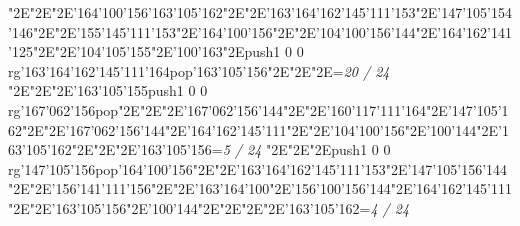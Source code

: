 \null\vfill\enskip\enskip\enskip\ipa\char"2E\enskip\enskip\enskip\ipa\char"2E\enskip\ipa\char"2E\ipa\char'164\ipa\char'100\ipa\char'156\bigskip\ipa\char'163\ipa\char'105\ipa\char'162\ipa\char"2E\enskip\enskip\enskip\ipa\char"2E\ipa\char'163\ipa\char'164\ipa\char'162\ipa\char'145\ipa\char'111\ipa\char'153\bigskip\enskip\enskip\ipa\char"2E\ipa\char'147\ipa\char'105\ipa\char'154\ipa\char'146\ipa\char"2E\enskip\ipa\char"2E\ipa\char'155\ipa\char'145\ipa\char'111\ipa\char'153\ipa\char"2E\ipa\char'164\ipa\char'100\ipa\char'156\ipa\char"2E\enskip\enskip\enskip\ipa\char"2E\ipa\char'104\ipa\char'100\ipa\char'156\ipa\char'144\bigskip\enskip\ipa\char"2E\ipa\char'164\ipa\char'162\ipa\char'141\ipa\char'125\ipa\char"2E\enskip\enskip\ipa\char"2E\ipa\char'104\ipa\char'105\ipa\char'155\ipa\char"2E\ipa\char'100\ipa\char'163\ipa\char"2E\pdfcolorstack\match push{1 0 0 rg}\ipa\char'163\ipa\char'164\ipa\char'162\ipa\char'145\ipa\char'111\ipa\char'164\pdfcolorstack\match pop{}\bigskip\ipa\char'163\ipa\char'105\ipa\char'156\ipa\char"2E\enskip\enskip\ipa\char"2E\enskip\enskip\enskip\ipa\char"2E\enskip\enskip\enskip\bigskip\vfill\footline={\hfill\tenrm\it 20 / 24}\eject
\null\vfill\enskip\enskip\enskip\ipa\char"2E\enskip\enskip\enskip\ipa\char"2E\enskip\ipa\char"2E\ipa\char'163\ipa\char'105\ipa\char'155\bigskip\pdfcolorstack\match push{1 0 0 rg}\ipa\char'167\ipa\char'062\ipa\char'156\pdfcolorstack\match pop{}\ipa\char"2E\enskip\enskip\enskip\ipa\char"2E\enskip\enskip\enskip\enskip\enskip\enskip\bigskip\enskip\enskip\ipa\char"2E\ipa\char'167\ipa\char'062\ipa\char'156\ipa\char'144\ipa\char"2E\enskip\ipa\char"2E\ipa\char'160\ipa\char'117\ipa\char'111\ipa\char'164\ipa\char"2E\ipa\char'147\ipa\char'105\ipa\char'162\ipa\char"2E\enskip\enskip\enskip\ipa\char"2E\ipa\char'167\ipa\char'062\ipa\char'156\ipa\char'144\bigskip\enskip\ipa\char"2E\ipa\char'164\ipa\char'162\ipa\char'145\ipa\char'111\ipa\char"2E\enskip\enskip\ipa\char"2E\ipa\char'104\ipa\char'100\ipa\char'156\ipa\char"2E\ipa\char'100\ipa\char'144\ipa\char"2E\enskip\enskip\enskip\enskip\enskip\enskip\bigskip\ipa\char'163\ipa\char'105\ipa\char'162\ipa\char"2E\enskip\enskip\ipa\char"2E\enskip\enskip\enskip\ipa\char"2E\ipa\char'163\ipa\char'105\ipa\char'156\bigskip\vfill\footline={\hfill\tenrm\it 5 / 24}\eject
\null\vfill\enskip\enskip\enskip\ipa\char"2E\enskip\enskip\enskip\ipa\char"2E\enskip\ipa\char"2E\pdfcolorstack\match push{1 0 0 rg}\ipa\char'147\ipa\char'105\ipa\char'156\pdfcolorstack\match pop{}\bigskip\ipa\char'164\ipa\char'100\ipa\char'156\ipa\char"2E\enskip\enskip\enskip\ipa\char"2E\ipa\char'163\ipa\char'164\ipa\char'162\ipa\char'145\ipa\char'111\ipa\char'153\bigskip\enskip\enskip\ipa\char"2E\ipa\char'147\ipa\char'105\ipa\char'156\ipa\char'144\ipa\char"2E\enskip\ipa\char"2E\ipa\char'156\ipa\char'141\ipa\char'111\ipa\char'156\ipa\char"2E\enskip\enskip\enskip\ipa\char"2E\ipa\char'163\ipa\char'164\ipa\char'100\ipa\char"2E\ipa\char'156\ipa\char'100\ipa\char'156\ipa\char'144\bigskip\enskip\ipa\char"2E\ipa\char'164\ipa\char'162\ipa\char'145\ipa\char'111\ipa\char"2E\enskip\enskip\ipa\char"2E\ipa\char'163\ipa\char'105\ipa\char'156\ipa\char"2E\ipa\char'100\ipa\char'144\ipa\char"2E\enskip\enskip\enskip\enskip\enskip\enskip\bigskip\enskip\enskip\enskip\ipa\char"2E\enskip\enskip\ipa\char"2E\enskip\enskip\enskip\ipa\char"2E\ipa\char'163\ipa\char'105\ipa\char'162\bigskip\vfill\footline={\hfill\tenrm\it 4 / 24}\eject
